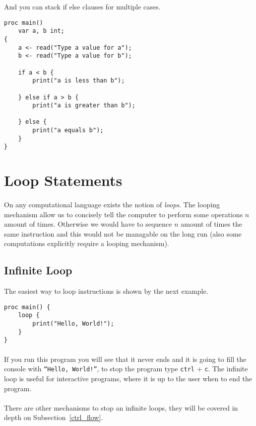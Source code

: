 \newpage

\noindent
And you can stack if else clauses for multiple cases.

\begin{verbatim}
proc main()
    var a, b int;
{
    a <- read("Type a value for a");
    b <- read("Type a value for b");

    if a < b {
        print("a is less than b");

    } else if a > b {
        print("a is greater than b");

    } else {
        print("a equals b");
    }
}
\end{verbatim}

\section{Loop Statements}

\paragraph{} On any computational language exists the notion of \emph{loops}.
The looping mechanism allow us to concisely tell the computer to perform
some operations $n$ amount of times. Otherwise we would have to sequence $n$
amount of times the same instruction and this would not be managable on the
long run (also some computations explicitly require a looping mechanism).

\subsection{Infinite Loop}
\noindent
The easiest way to loop instructions is shown by the next example.

\begin{verbatim}
proc main() {
    loop {
        print("Hello, World!");
    }
}
\end{verbatim}

\paragraph{} If you run this program you will see that it never ends and it is
going to fill the console with \texttt{``Hello, World!''}, to stop the
program type \texttt{ctrl} + \texttt{c}. The infinite loop is useful for
interactive programs, where it is up to the user when to end the program.

\paragraph{} There are other mechanisms to stop an infinite loops, they will be
covered in depth on Subsection~\ref{ctrl_flow}.

